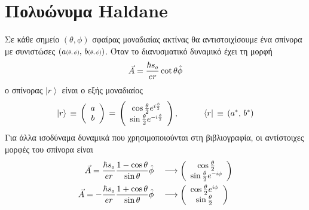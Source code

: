 \section{Πολυώνυμα Haldane}
Σε κάθε σημείο $(\theta,\phi)$ σφαίρας μοναδιαίας ακτίνας θα αντιστοιχίσουμε ένα σπίνορα με συνιστώσες $\left( a\text{\scalebox{0.7}{$(\theta,\phi)$}},\,b\text{\scalebox{0.7}{$(\theta,\phi)$}}\right)$. Όταν το διανυσματικό δυναμικό 
έχει τη μορφή
\begin{equation}
    \Vec{A}=\frac{\hbar s\subscr{o}}{er}\cot\theta\hat{\phi}
\end{equation}
ο σπίνορας $\left|r\right>$ είναι ο εξής μοναδιαίος
\begin{equation}\label{spinor for position}
    \left|r\right>\,\equiv\,\left(\begin{array}{c}
        a\\b
    \end{array}\right)\,=\,\left(\begin{array}{c}
         \cos\frac{\theta}{2}e\superscr{i\frac{\phi}{2}}  \\
         \sin\frac{\theta}{2}e\superscr{-i\frac{\phi}{2}}
    \end{array}\right),\qquad\quad \left<r\right|\,\equiv\,(a\superscr{*},\,b\superscr{*})
\end{equation}
Για άλλα ισοδύναμα δυναμικά που χρησιμοποιούνται στη βιβλιογραφία, οι αντίστοιχες μορφές του σπίνορα είναι 
\begin{equation}
\begin{split}
    \Vec{A}=\frac{\hbar s\subscr{o}}{er}\frac{1-\cos\theta}{\sin\theta}\hat{\phi} &\quad\longrightarrow \left(\begin{array}{c}
         \cos\frac{\theta}{2} \\
         \sin\frac{\theta}{2}e\superscr{-i\phi}
    \end{array}\right)\\
    \Vec{A}=-\frac{\hbar s\subscr{o}}{er}\frac{1+\cos\theta}{\sin\theta}\hat{\phi} &\quad\longrightarrow \left(\begin{array}{c}
         \cos\frac{\theta}{2}e\superscr{i\phi}  \\
         \sin\frac{\theta}{2}
    \end{array}\right)
\end{split}
\end{equation}
